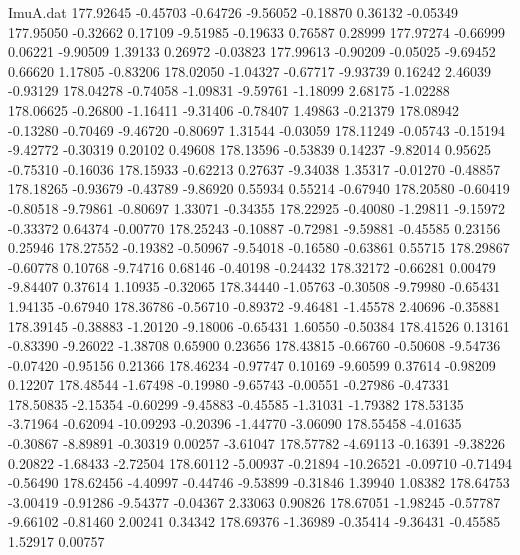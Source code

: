\begin{filecontents}{ImuA.dat}
 177.92645   -0.45703   -0.64726   -9.56052   -0.18870    0.36132   -0.05349
 177.95050   -0.32662    0.17109   -9.51985   -0.19633    0.76587    0.28999
 177.97274   -0.66999    0.06221   -9.90509    1.39133    0.26972   -0.03823
 177.99613   -0.90209   -0.05025   -9.69452    0.66620    1.17805   -0.83206
 178.02050   -1.04327   -0.67717   -9.93739    0.16242    2.46039   -0.93129
 178.04278   -0.74058   -1.09831   -9.59761   -1.18099    2.68175   -1.02288
 178.06625   -0.26800   -1.16411   -9.31406   -0.78407    1.49863   -0.21379
 178.08942   -0.13280   -0.70469   -9.46720   -0.80697    1.31544   -0.03059
 178.11249   -0.05743   -0.15194   -9.42772   -0.30319    0.20102    0.49608
 178.13596   -0.53839    0.14237   -9.82014    0.95625   -0.75310   -0.16036
 178.15933   -0.62213    0.27637   -9.34038    1.35317   -0.01270   -0.48857
 178.18265   -0.93679   -0.43789   -9.86920    0.55934    0.55214   -0.67940
 178.20580   -0.60419   -0.80518   -9.79861   -0.80697    1.33071   -0.34355
 178.22925   -0.40080   -1.29811   -9.15972   -0.33372    0.64374   -0.00770
 178.25243   -0.10887   -0.72981   -9.59881   -0.45585    0.23156    0.25946
 178.27552   -0.19382   -0.50967   -9.54018   -0.16580   -0.63861    0.55715
 178.29867   -0.60778    0.10768   -9.74716    0.68146   -0.40198   -0.24432
 178.32172   -0.66281    0.00479   -9.84407    0.37614    1.10935   -0.32065
 178.34440   -1.05763   -0.30508   -9.79980   -0.65431    1.94135   -0.67940
 178.36786   -0.56710   -0.89372   -9.46481   -1.45578    2.40696   -0.35881
 178.39145   -0.38883   -1.20120   -9.18006   -0.65431    1.60550   -0.50384
 178.41526    0.13161   -0.83390   -9.26022   -1.38708    0.65900    0.23656
 178.43815   -0.66760   -0.50608   -9.54736   -0.07420   -0.95156    0.21366
 178.46234   -0.97747    0.10169   -9.60599    0.37614   -0.98209    0.12207
 178.48544   -1.67498   -0.19980   -9.65743   -0.00551   -0.27986   -0.47331
 178.50835   -2.15354   -0.60299   -9.45883   -0.45585   -1.31031   -1.79382
 178.53135   -3.71964   -0.62094  -10.09293   -0.20396   -1.44770   -3.06090
 178.55458   -4.01635   -0.30867   -8.89891   -0.30319    0.00257   -3.61047
 178.57782   -4.69113   -0.16391   -9.38226    0.20822   -1.68433   -2.72504
 178.60112   -5.00937   -0.21894  -10.26521   -0.09710   -0.71494   -0.56490
 178.62456   -4.40997   -0.44746   -9.53899   -0.31846    1.39940    1.08382
 178.64753   -3.00419   -0.91286   -9.54377   -0.04367    2.33063    0.90826
 178.67051   -1.98245   -0.57787   -9.66102   -0.81460    2.00241    0.34342
 178.69376   -1.36989   -0.35414   -9.36431   -0.45585    1.52917    0.00757

\end{filecontents}
